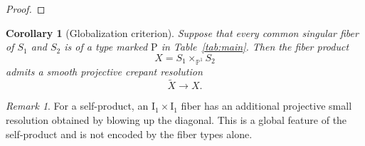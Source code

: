 \documentclass[a4paper]{amsart}
\theoremstyle{plain}
\newtheorem{Cor}[Thm]{Corollary}
\theoremstyle{definition}
\theoremstyle{remark}
\newtheorem{Rem}[Thm]{Remark}
\numberwithin{equation}{section}
\newcommand{\PP}{\mathbb{P}}
\begin{document}
\begin{proof}

\end{proof}
\begin{Cor}[Globalization criterion]\label{cor:globalization}
	Suppose that every common singular fiber of $S_1$ and $S_2$ is of a
	type marked $\mathrm{P}$ in Table~\ref{tab:main}. Then the fiber product
	\[
	X=S_1\times_{\PP^1}S_2
	\]
	admits a smooth projective crepant resolution
	\[
	\widetilde X\longrightarrow X.
	\]
\end{Cor}

\begin{Rem}
For a self-product, an $\mathrm{I}_1\times\mathrm{I}_1$ fiber has an
additional projective small resolution obtained by blowing up the
diagonal.  This is a global feature of the self-product and is not encoded
by the fiber types alone.
\end{Rem}
\end{document}
